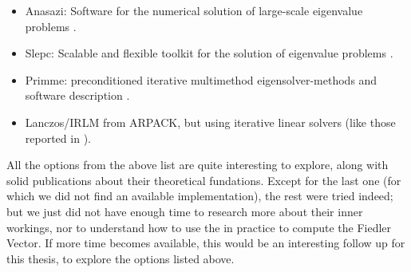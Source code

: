 \begin{itemize}
  \item Anasazi: Software for the numerical solution of large-scale
    eigenvalue problems \cite{anasazi}.
  \item Slepc: Scalable and flexible toolkit for the solution of
    eigenvalue problems \cite{slepc}.
  \item Primme: preconditioned iterative multimethod
    eigensolver-methods and software description \cite{primme}.
  \item Lanczos/IRLM from ARPACK, but using iterative linear solvers
    (like those reported in \cite{martinez16}). 
\end{itemize}

All the options from the above list are quite interesting to explore, 
along with solid publications about their theoretical
fundations. Except for the last one (for which we did not find an
available implementation), the rest were tried indeed; but we just did
not have enough time to research more about their inner workings, nor
to understand how to use the in practice to compute the Fiedler
Vector. If more time becomes available, this would be an interesting
follow up for this thesis, to explore the options listed above.

